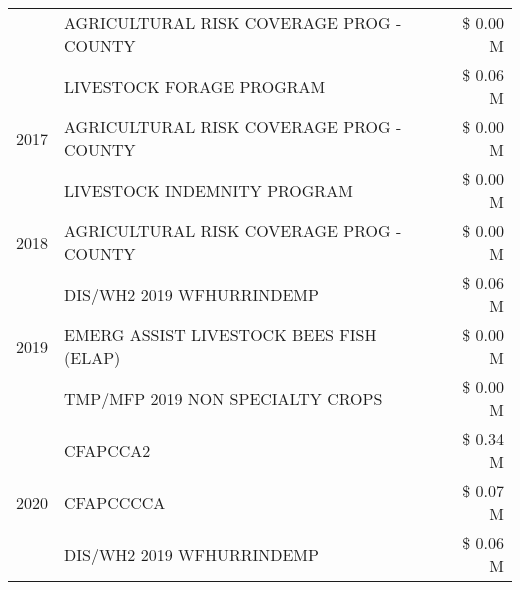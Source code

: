 \begin{tabular}{llr}
 & AGRICULTURAL RISK COVERAGE PROG - COUNTY & \$ 0.00 M \\
\cline{1-3}
\multirow[t]{3}{*}{2017} & LIVESTOCK FORAGE PROGRAM & \$ 0.06 M \\
 & AGRICULTURAL RISK COVERAGE PROG - COUNTY & \$ 0.00 M \\
 & LIVESTOCK INDEMNITY PROGRAM & \$ 0.00 M \\
\cline{1-3}
2018 & AGRICULTURAL RISK COVERAGE PROG - COUNTY & \$ 0.00 M \\
\cline{1-3}
\multirow[t]{3}{*}{2019} & DIS/WH2 2019 WFHURRINDEMP & \$ 0.06 M \\
 & EMERG ASSIST LIVESTOCK BEES FISH (ELAP) & \$ 0.00 M \\
 & TMP/MFP 2019 NON SPECIALTY CROPS & \$ 0.00 M \\
\cline{1-3}
\multirow[t]{3}{*}{2020} & CFAPCCA2 & \$ 0.34 M \\
 & CFAPCCCCA & \$ 0.07 M \\
 & DIS/WH2 2019 WFHURRINDEMP & \$ 0.06 M \\
\cline{1-3}
\bottomrule
\end{tabular}
